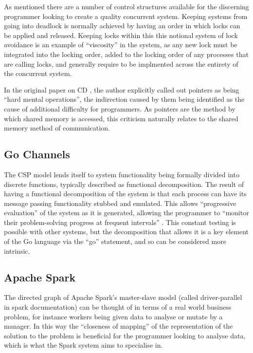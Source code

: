 \documentclass{sig-alternate}
\begin{document}
As mentioned there are a number of control structures available for the discerning programmer looking to create a quality concurrent system. Keeping systems from going into deadlock is normally achieved by having an order in which locks can be applied and released. Keeping locks within this this notional system of lock avoidance is an example of ``viscosity'' in the system, as any new lock must be integrated into the locking order, added to the locking order of any processes that are calling locks, and generally require to be implmented across the entirety of the concurrent system.

In the original paper on CD \cite{enpl}, the author explicitly called out pointers as being ``hard mental operations'', the indirection caused by them being identified as the cause of additional difficulty for programmers. As pointers are the method by which shared memory is accessed, this criticism naturally relates to the shared memory method of communication.

\subsection{Go Channels}

The CSP model lends itself to system functionality being formally divided into discrete functions, typically described as functional decomposition. 
The result of having a functional decomposition of the system is that each process can have its message passing functionality stubbed and emulated. This allows ``progressive evaluation'' of the system as it is generated, allowing the programmer to ``monitor their problem-solving progress at frequent intervals'' \cite{enpl}. This constant testing is possible with other systems, but the decomposition that allows it is a key element of the Go language via the ``go'' statement, and so can be considered more intrinsic.

\subsection{Apache Spark}
The directed graph of Apache Spark's master-slave model (called driver-parallel in spark documentation) can be thought of in terms of a real world business problem, for instance workers being given data to analyse or mutate by a manager. In this way the ``closeness of mapping'' of the representation of the solution to the problem is beneficial for the programmer looking to analyse data, which is what the Spark system aims to specialise in.
\end{document}
